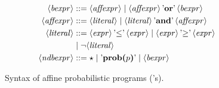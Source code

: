 \begin{figure}
\begin{align*}
\\
%
%
\langle \mathit{bexpr}\rangle &::=  \langle \mathit{affexpr} \rangle \mid
\langle \mathit{affexpr} \rangle \, \text{'\textbf{or}'} \,
\langle\mathit{bexpr}\rangle
\vspace{0.5\baselineskip}
\\
%
\langle\mathit{affexpr} \rangle &::=  \langle\mathit{literal} \rangle\mid
\langle\mathit{literal} \rangle\, \text{'\textbf{and}'}
\,\langle\mathit{affexpr} \rangle
\\
%
\langle\mathit{literal} \rangle &::= \langle\mathit{expr} \rangle\,
\text{'$\leq$'} \,\langle\mathit{expr} \rangle \mid \langle\mathit{expr}
\rangle\, \text{'$\geq$'} \,\langle\mathit{expr} \rangle
\\
%
&\mid \neg \langle \mathit{literal} \rangle
\\
%
\langle\mathit{ndbexpr} \rangle &::= {\star}\mid
\text{'\textbf{prob($p$)}'} \mid \langle\mathit{bexpr} \rangle
\end{align*}
\caption{Syntax of affine probabilistic programs (\APP 's).}
\label{fig:syntax}
\end{figure}

